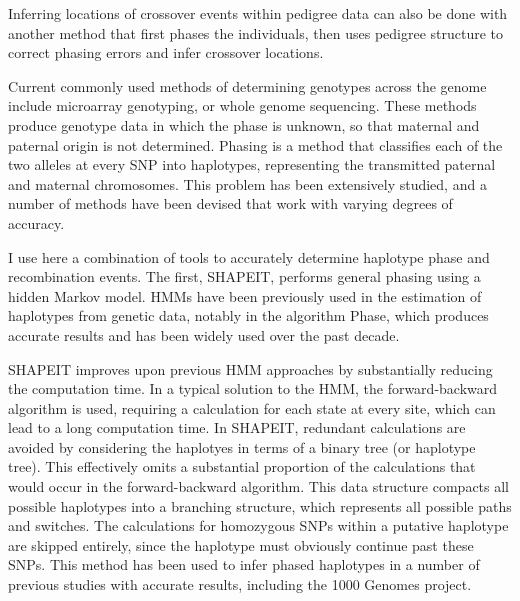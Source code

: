 Inferring locations of crossover events within pedigree data can also be done with another method that first phases the individuals, then uses pedigree structure to correct phasing errors and infer crossover locations.

Current commonly used methods of determining genotypes across the genome include microarray genotyping, or whole genome sequencing.
These methods produce genotype data in which the phase is unknown, so that maternal and paternal origin is not determined.
Phasing is a method that classifies each of the two alleles at every SNP into haplotypes, representing the transmitted paternal and maternal chromosomes.
This problem has been extensively studied, and a number of methods have been devised that work with varying degrees of accuracy.

I use here a combination of tools to accurately determine haplotype phase and recombination events.
The first, SHAPEIT\cite{Delaneau2013}, performs general phasing using a hidden Markov model.
HMMs have been previously used in the estimation of haplotypes from genetic data, notably in the algorithm Phase\cite{Stephens2001}, which produces accurate results and has been widely used over the past decade.

SHAPEIT improves upon previous HMM approaches by substantially reducing the computation time.
In a typical solution to the HMM, the forward-backward algorithm is used, requiring a calculation for each state at every site, which can lead to a long computation time.
In SHAPEIT, redundant calculations are avoided by considering the haplotyes in terms of a binary tree (or haplotype tree)\cite{Delaneau2013}.
This effectively omits a substantial proportion of the calculations that would occur in the forward-backward algorithm.
This data structure compacts all possible haplotypes into a branching structure, which represents all possible paths and switches.
The calculations for homozygous SNPs within a putative haplotype are skipped entirely, since the haplotype must obviously continue past these SNPs.
This method has been used to infer phased haplotypes in a number of previous studies with accurate results, including the 1000 Genomes project\cite{1000G2015}.


